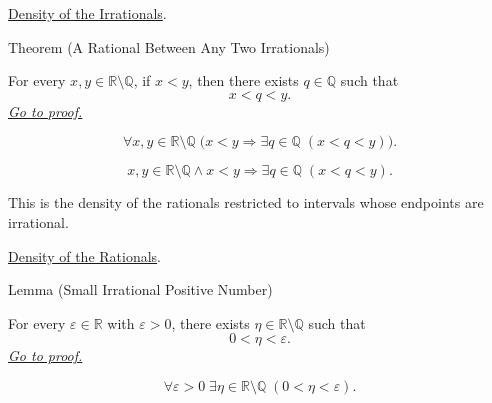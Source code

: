 \begin{dependencies}
\hyperref[thm:density-of-irrationals-in-reals]{Density of the Irrationals}.
\end{dependencies}

\begin{theorembox}{Theorem (A Rational Between Any Two Irrationals)}
\begin{theorem}
\label{thm:rational-between-any-two-irrationals}
For every $x,y\in\mathbb{R}\setminus\mathbb{Q}$, if $x<y$, then there exists
$q\in\mathbb{Q}$ such that
\[
  x<q<y.
\]
\hyperref[prf:rational-between-any-two-irrationals]{\textit{Go to proof.}}
\end{theorem}
\end{theorembox}

\begin{remark*}
\[
\forall x,y\in\mathbb{R}\setminus\mathbb{Q}\;
\bigl(x<y\Longrightarrow \exists q\in\mathbb{Q}\;(x<q<y)\bigr).
\]
\end{remark*}

\begin{remark*}
\[
x,y\in\mathbb{R}\setminus\mathbb{Q}\land x<y
\Longrightarrow \exists q\in\mathbb{Q}\;(x<q<y).
\]
\end{remark*}

\begin{remark*}[Interpretation]
This is the density of the rationals restricted to intervals whose endpoints
are irrational.
\end{remark*}

\begin{dependencies}
\hyperref[thm:density-of-rationals-in-reals]{Density of the Rationals}.
\end{dependencies}

\begin{lemmabox}{Lemma (Small Irrational Positive Number)}
\begin{lemma}
\label{lem:small-irrational-positive-number}
For every $\varepsilon\in\mathbb{R}$ with $\varepsilon>0$, there exists
$\eta\in\mathbb{R}\setminus\mathbb{Q}$ such that
\[
  0<\eta<\varepsilon.
\]
\hyperref[prf:small-irrational-positive-number]{\textit{Go to proof.}}
\end{lemma}
\end{lemmabox}

\begin{remark*}
\[
\forall \varepsilon>0\;\exists \eta\in\mathbb{R}\setminus\mathbb{Q}\;
(0<\eta<\varepsilon).
\]
\end{remark*}

